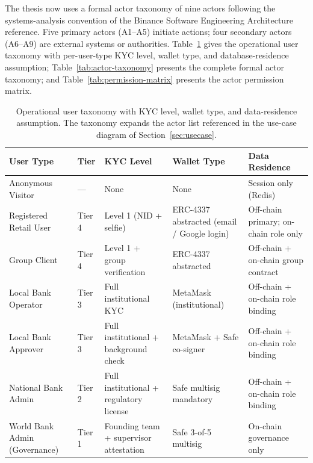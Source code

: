 \documentclass[12pt,a4paper]{report}
\begin{document}
The thesis now uses a formal actor taxonomy of nine actors following the systems-analysis convention of the Binance Software Engineering Architecture reference. Five primary actors (A1--A5) initiate actions; four secondary actors (A6--A9) are external systems or authorities. Table~\ref{tab:user-taxonomy} gives the operational user taxonomy with per-user-type KYC level, wallet type, and database-residence assumption; Table~\ref{tab:actor-taxonomy} presents the complete formal actor taxonomy; and Table~\ref{tab:permission-matrix} presents the actor permission matrix.

\begin{table}[H]
\centering
\caption{Operational user taxonomy with KYC level, wallet type, and data-residence assumption. The taxonomy expands the actor list referenced in the use-case diagram of Section~\ref{sec:usecase}.}
\label{tab:user-taxonomy}
\small
\begin{tabular}{p{3.1cm}p{1.4cm}p{2.6cm}p{2.4cm}p{3.4cm}}
\hline
\textbf{User Type} & \textbf{Tier} & \textbf{KYC Level} & \textbf{Wallet Type} & \textbf{Data Residence} \\
\hline
Anonymous Visitor & --- & None & None & Session only (Redis) \\
\hline
Registered Retail User & Tier 4 & Level 1 (NID + selfie) & ERC-4337 abstracted (email / Google login) & Off-chain primary; on-chain role only \\
\hline
Group Client & Tier 4 & Level 1 + group verification & ERC-4337 abstracted & Off-chain + on-chain group contract \\
\hline
Local Bank Operator & Tier 3 & Full institutional KYC & MetaMask (institutional) & Off-chain + on-chain role binding \\
\hline
Local Bank Approver & Tier 3 & Full institutional + background check & MetaMask + Safe co-signer & Off-chain + on-chain role binding \\
\hline
National Bank Admin & Tier 2 & Full institutional + regulatory license & Safe multisig mandatory & Off-chain + on-chain role binding \\
\hline
World Bank Admin (Governance) & Tier 1 & Founding team + supervisor attestation & Safe 3-of-5 multisig & On-chain governance only \\
\hline
\end{tabular}
\end{table}
\end{document}

